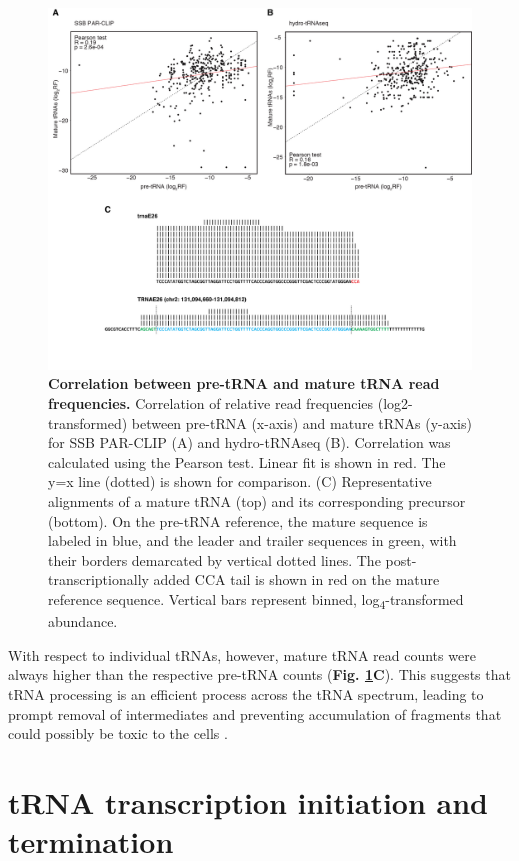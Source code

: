 \documentclass[12pt]{rockefeller}
\newcommand{\sub}[1]{\textsubscript{#1}}
\begin{document}
\begin{figure}[!h]%
\centering
\includegraphics[width=\textwidth]{supp4b.png}%
\caption[Correlation between pre-tRNA and mature tRNA read frequencies.]
{
\textbf{Correlation between pre-tRNA and mature tRNA read frequencies.}
Correlation of relative read frequencies (log2-transformed) between pre-tRNA (x-axis) and mature tRNAs (y-axis) for SSB PAR-CLIP (A) and hydro-tRNAseq (B). Correlation was calculated using the Pearson test. Linear fit is shown in red. The y=x line (dotted) is shown for comparison. (C) Representative alignments of a mature tRNA (top) and its corresponding precursor (bottom). On the pre-tRNA reference, the mature sequence is labeled in blue, and the leader and trailer sequences in green, with their borders demarcated by vertical dotted lines. The post-transcriptionally added CCA tail is shown in red on the mature reference sequence. Vertical bars represent binned, log\sub{4}-transformed abundance. 
}
\centering
\label{supp4}%
\end{figure}

With respect to individual tRNAs, however, mature tRNA read counts were always higher than the respective pre-tRNA counts (\textbf{Fig. \ref{supp4}C}). This  suggests that tRNA processing is an efficient process across the tRNA spectrum, leading to prompt removal of intermediates and preventing accumulation of fragments that could possibly be toxic to the cells \cite{Hanada:2013bk}. 

\section{tRNA transcription initiation and termination}
\end{document}
